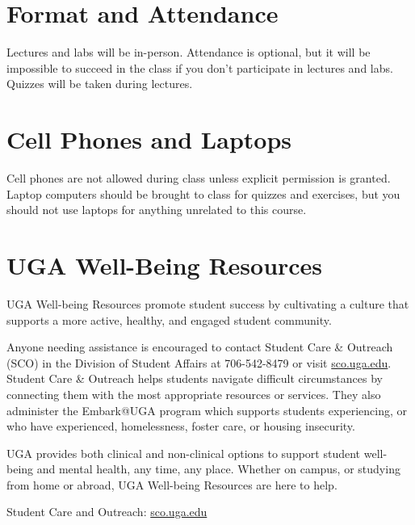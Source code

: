 \documentclass[12pt]{article}
\begin{document}

\section*{\normalsize Format and Attendance}
\vspace{-4mm}
Lectures and labs will be in-person. Attendance is optional, but it
will be impossible to succeed in the class if you don't participate in
lectures and labs. Quizzes will be taken during lectures. 

\section*{\normalsize Cell Phones and Laptops}
\vspace{-4mm}
Cell phones are not allowed during class unless explicit permission is
granted. Laptop computers should be brought to class for quizzes and
exercises, but you should not use laptops for anything unrelated to
this course.


\section*{\normalsize UGA Well-Being Resources}
\vspace{-4mm}

UGA Well-being Resources promote student success by cultivating a
culture that supports a more active, healthy, and engaged student
community. 

Anyone needing assistance is encouraged to contact Student Care \&
Outreach (SCO) in the Division of Student Affairs at 706-542-8479 or
visit \url{sco.uga.edu}. Student Care \& Outreach helps students
navigate difficult circumstances by connecting them with the most
appropriate resources or services. They also administer the Embark@UGA
program which supports students experiencing, or who have experienced,
homelessness, foster care, or housing insecurity. 

UGA provides both clinical and non-clinical options to support student
well-being and mental health, any time, any place. Whether on campus,
or studying from home or abroad, UGA Well-being Resources are here to
help. 


Student Care and Outreach: \url{sco.uga.edu}
\end{document}
